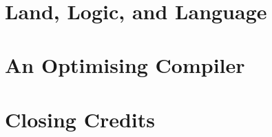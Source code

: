 \documentclass[11pt,draft,a4paper,oneside,openany]{memoir}
\begin{document}
\frontmatter

 \clearpage

\maketitle
~
\vspace{3cm}
  \begin{abstract}

  \end{abstract}

\setlength{\cftpartnumwidth}{4em}

\clearpage
\tableofcontents*
\newpage

\mainmatter
{}

\part{Land, Logic, and Language}







\part{An Optimising Compiler}















\clearpage

\part{Closing Credits}

{}
\printbibliography

\backmatter
\appendix

\end{document}
